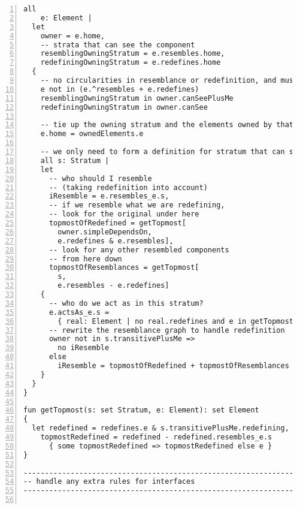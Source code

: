 \begin{lstlisting}[caption={facts.als}, numbers=left]
  all
    e: Element |
  let
    owner = e.home,
    -- strata that can see the component
    resemblingOwningStratum = e.resembles.home,
    redefiningOwningStratum = e.redefines.home
  {
    -- no circularities in resemblance or redefinition, and must be visible
    e not in (e.^resembles + e.redefines)
    resemblingOwningStratum in owner.canSeePlusMe
    redefiningOwningStratum in owner.canSee
    
    -- tie up the owning stratum and the elements owned by that stratum
    e.home = ownedElements.e

    -- we only need to form a definition for stratum that can see us
    all s: Stratum |
    let
      -- who should I resemble
      -- (taking redefinition into account)
      iResemble = e.resembles_e.s,
      -- if we resemble what we are redefining,
      -- look for the original under here
      topmostOfRedefined = getTopmost[
        owner.simpleDependsOn,
        e.redefines & e.resembles],
      -- look for any other resembled components
      -- from here down
      topmostOfResemblances = getTopmost[
        s,
        e.resembles - e.redefines]
    {
      -- who do we act as in this stratum?
      e.actsAs_e.s =
        { real: Element | no real.redefines and e in getTopmost[s, real] }
      -- rewrite the resemblance graph to handle redefinition
      owner not in s.transitivePlusMe =>
        no iResemble
      else
        iResemble = topmostOfRedefined + topmostOfResemblances
    }
  }
}

fun getTopmost(s: set Stratum, e: Element): set Element
{
  let redefined = redefines.e & s.transitivePlusMe.redefining,
    topmostRedefined = redefined - redefined.resembles_e.s
      { some topmostRedefined => topmostRedefined else e }
}

--------------------------------------------------------------------
-- handle any extra rules for interfaces
--------------------------------------------------------------------


\end{lstlisting}
